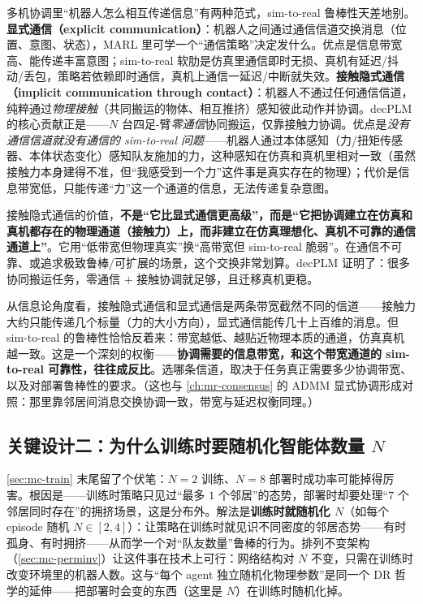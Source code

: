 多机协调里“机器人怎么相互传递信息”有两种范式，sim-to-real 鲁棒性天差地别。\textbf{显式通信（explicit communication）}：机器人之间通过通信信道交换消息（位置、意图、状态），MARL 里可学一个“通信策略”决定发什么。优点是信息带宽高、能传递丰富意图；sim-to-real 软肋是仿真里通信即时无损、真机有延迟/抖动/丢包，策略若依赖即时通信，真机上通信一延迟/中断就失效。\textbf{接触隐式通信（implicit communication through contact）}：机器人不通过任何通信信道，纯粹通过\emph{物理接触}（共同搬运的物体、相互推挤）感知彼此动作并协调。decPLM 的核心贡献正是——$N$ 台四足-臂\emph{零通信}协同搬运，仅靠接触力协调\cite{pandit2025decplm}。优点是\emph{没有通信信道就没有通信的 sim-to-real 问题}——机器人通过本体感知（力/扭矩传感器、本体状态变化）感知队友施加的力，这种感知在仿真和真机里相对一致（虽然接触力本身建得不准，但“我感受到一个力”这件事是真实存在的物理）；代价是信息带宽低，只能传递“力”这一个通道的信息，无法传递复杂意图。

\begin{insight}
接触隐式通信的价值，\textbf{不是“它比显式通信更高级”，而是“它把协调建立在仿真和真机都存在的物理通道（接触力）上，而非建立在仿真理想化、真机不可靠的通信通道上”}。它用“低带宽但物理真实”换“高带宽但 sim-to-real 脆弱”。在通信不可靠、或追求极致鲁棒/可扩展的场景，这个交换非常划算。decPLM 证明了：很多协同搬运任务，零通信 $+$ 接触协调就足够，且迁移真机更稳。
\end{insight}

\begin{insight}
从信息论角度看，接触隐式通信和显式通信是两条带宽截然不同的信道——接触力大约只能传递几个标量（力的大小方向），显式通信能传几十上百维的消息。但 sim-to-real 的鲁棒性恰恰反着来：带宽越低、越贴近物理本质的通道，仿真真机越一致。这是一个深刻的权衡——\textbf{协调需要的信息带宽，和这个带宽通道的 sim-to-real 可靠性，往往成反比}。选哪条信道，取决于任务真正需要多少协调带宽、以及对部署鲁棒性的要求。（这也与 \cref{ch:mr-consensus} 的 ADMM 显式协调形成对照：那里靠邻居间消息交换协调一致，带宽与延迟权衡同理。）
\end{insight}

\subsection{关键设计二：为什么训练时要随机化智能体数量 $N$}
\label{sec:mc-n-random}

\cref{sec:mc-train} 末尾留了个伏笔：$N{=}2$ 训练、$N{=}8$ 部署时成功率可能掉得厉害。根因是——训练时策略只见过“最多 $1$ 个邻居”的态势，部署时却要处理“$7$ 个邻居同时存在”的拥挤场景，这是分布外。解法是\textbf{训练时就随机化 $N$}（如每个 episode 随机 $N\in[2,4]$）：让策略在训练时就见识不同密度的邻居态势——有时孤身、有时拥挤——从而学一个对“队友数量”鲁棒的行为。排列不变架构（\cref{sec:mc-perminv}）让这件事在技术上可行：网络结构对 $N$ 不变，只需在训练时改变环境里的机器人数。这与“每个 agent 独立随机化物理参数”是同一个 DR 哲学的延伸——把部署时会变的东西（这里是 $N$）在训练时随机化掉。

